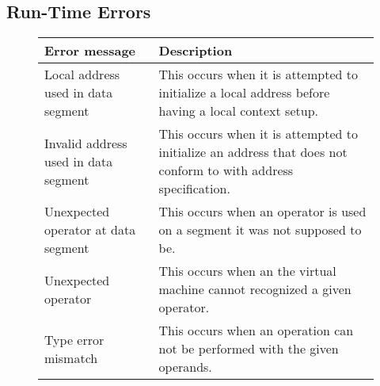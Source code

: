 \newpage

\subsection{Run-Time Errors}
\begin{figure}[h]
    \centering
    \begin{tabular}{p{1.5in}p{2.5in}}
        \toprule
        \textbf{Error message} & \textbf{Description}\\

        \midrule Local address used \newline in data segment &
        This occurs when it is attempted to initialize a local address before
        having a local context setup.\\

        \midrule Invalid address used \newline in data segment &
        This occurs when it is attempted to initialize an address that does not
        conform to with address specification.\\

        \midrule Unexpected operator \newline at data segment &
        This occurs when an operator is used on a segment it was not supposed
        to be.\\

        \midrule Unexpected operator &
	This occurs when an the virtual machine cannot recognized a given 
	operator.\\

        \midrule Type error mismatch &
        This occurs when an operation can not be performed with the given
        operands.\\

        \bottomrule
    \end{tabular}
\end{figure}

